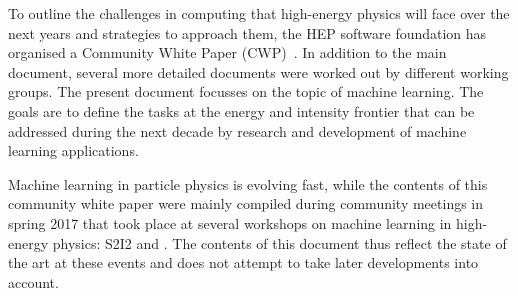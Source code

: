 To outline the challenges in computing that high-energy physics will face over the next years and strategies to approach them, the HEP software foundation has organised a Community White Paper (CWP)~\cite{mainCWP}. In addition to the main document, several more detailed documents were worked out by different working groups. The present document focusses on the topic of machine learning.
The goals are to define the tasks at the energy and intensity frontier that can be addressed during the next decade by research and development of machine learning applications. %

Machine learning in particle physics is evolving fast, while the contents of this community white paper were mainly compiled during community meetings in spring 2017 that took place at several workshops on machine learning in high-energy physics: S2I2 and \cite{DSatHEP2017,IML2017,ACAT2017,HSF2017}.
The contents of this document thus reflect the state of the art at these events and does not attempt to take later developments into account.
